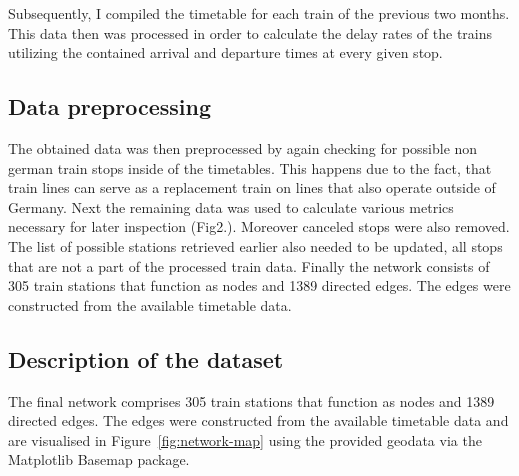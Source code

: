 \documentclass[12pt,a4paper]{article}
\begin{document}
Subsequently, I compiled the timetable for each train of the previous two months. This data then was processed in order to calculate the delay rates of the trains utilizing the contained arrival and departure times at every given stop.

\maketitle
\subsection{\label{sec:Preprocessing}Data preprocessing}

The obtained data was then preprocessed by again checking for possible non german train stops inside of the timetables. This happens due to the fact, that train lines can serve as a replacement train on lines that also operate outside of Germany. Next the remaining data was used to calculate various metrics necessary for later inspection (Fig2.). Moreover canceled stops were also removed. 
The list of possible stations retrieved earlier also needed to be updated, all stops that are not a part of the processed train data. Finally the network consists of 305 train stations that function as nodes and 1389 directed edges. The edges were constructed from the available timetable data.

\maketitle
\subsection{\label{sec:Preprocessing}Description of the dataset}

The final network comprises 305 train stations that function as nodes and 1389 directed edges. The edges were constructed from the available timetable data and are visualised in Figure~\ref{fig:network-map} using the provided geodata via the Matplotlib Basemap package.
\end{document}
